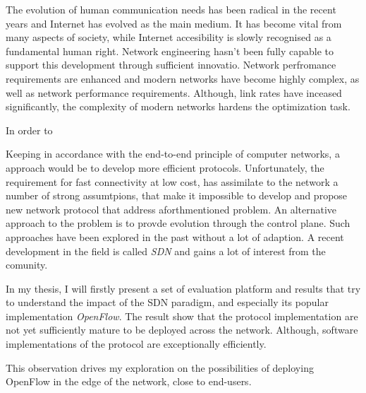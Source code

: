 


\begin{abstracts}        %


The evolution of human communication needs has been radical in the recent years and Internet
has evolved as the main medium. It has become vital from many aspects of society, while Internet
accesibility is slowly recognised as a fundamental human right. Network engineering hasn't
been fully capable to support this development through sufficient innovatio. Network perfromance 
requirements are enhanced and modern networks have
become highly complex, as well as network performance requirements.  Although, link rates
have inceased significantly, the complexity of modern networks hardens the optimization
task. 

In order to 

Keeping in accordance with the  end-to-end principle of computer networks, a approach
would be to develop more efficient protocols. Unfortunately, the requirement for fast
connectivity at low cost, has assimilate to the network a number of strong assumtpions,
that make it impossible to develop and propose new network protocol that address
aforthmentioned problem. An alternative approach to the problem is to provde evolution
through the control plane. Such approaches have been explored in the past without a lot of
adaption. A recent development in the field is called {\it SDN} and gains a lot of
interest from the comunity. 

In my thesis, I will firstly present a set of evaluation platform and results that try to
understand the impact of the SDN paradigm, and especially its popular implementation {\it
OpenFlow}. The result show that the protocol implementation are not yet sufficiently
mature to be deployed across the network. Although, software implementations of the
protocol are exceptionally efficiently. 

This observation drives my exploration on the possibilities of deploying OpenFlow in the
edge of the network, close to end-users. 




\end{abstracts}




